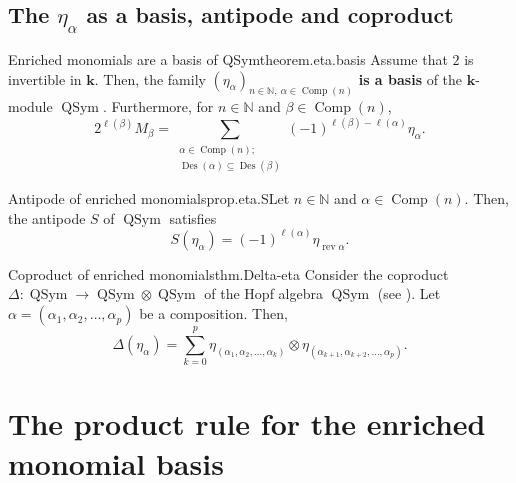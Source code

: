 \documentclass[numbers=enddot,12pt,final,onecolumn,notitlepage]{scrartcl}%
\newcommand{\al}{\alpha}
\newcommand{\NN}{\mathbb{N}} %
\newcommand{\kk}{\mathbf{k}} %
\newcommand{\QSym}{\operatorname{QSym}}
\newcommand{\Des}{\operatorname{Des}}
\newcommand{\Comp}{\operatorname{Comp}}
\newcommand{\0}{\phantom{c}}
\let\sumnonlimits\sum
\renewcommand{\sum}{\sumnonlimits\limits}
\begin{document}
\subsection{The $\eta_{\alpha}$ as a basis, antipode and coproduct}
\begin{theorem}{Enriched monomials are a basis of QSym}{theorem.eta.basis}
Assume that $2$ is invertible in $\kk$. Then, the
family $\left(  \eta_{\alpha}\right)  _{n \in \NN,\ \alpha\in\Comp(n)}$ \textbf{is a basis} of the $\kk$-module $\QSym$. Furthermore, for $n\in\NN$ and $\beta\in
\Comp(n)$,%
\[
2^{\ell\left(  \beta\right)  }M_{\beta}=\sum_{\substack{\alpha\in
\Comp(n);\\\Des\left(  \alpha\right)  \subseteq \Des\left(
\beta\right)  }}\left(  -1\right)  ^{\ell\left(  \beta\right)  -\ell\left(
\alpha\right)  }\eta_{\alpha}.
\]

\end{theorem}

\begin{proposition}{Antipode of enriched monomials}{prop.eta.S}Let $n \in \NN$ and $\alpha\in\Comp(n)$. Then, the antipode $S$
of $\QSym$ satisfies
\[
S\left(  \eta_{\alpha}\right)  =\left(  -1\right)  ^{\ell\left(
\alpha\right)  }\eta_{\operatorname*{rev}\alpha}.
\]

\end{proposition}

\begin{theorem}{Coproduct of enriched monomials}{thm.Delta-eta} Consider the coproduct $\Delta:\operatorname*{QSym}\rightarrow
\operatorname*{QSym}\otimes\operatorname*{QSym}$ of the Hopf algebra
$\operatorname*{QSym}$ (see \cite[\S 5.1]{GriRei20}). Let $\alpha = \left(\al_1, \al_2, \ldots, \al_p\right)$
be a composition. Then,
\[
\Delta\left(  \eta_{\alpha}\right)  =\sum_{k=0}^p
\eta_{\left(\al_1, \al_2, \ldots, \al_k\right)} \otimes
\eta_{\left(\al_{k+1}, \al_{k+2}, \ldots, \al_p\right)} .
\]

\end{theorem}

\section{The product rule for the enriched monomial basis}
\end{document}
